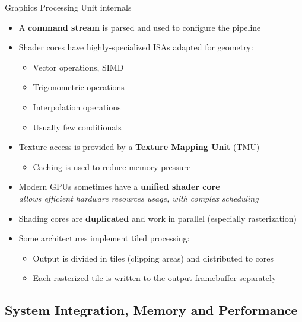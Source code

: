 \begin{frame}{Graphics Processing Unit internals}
  \begin{itemize}
  \item A \textbf{command stream} is parsed and used to configure the pipeline
  \item Shader cores have highly-specialized ISAs adapted for geometry:
  \begin{minipage}[b]{0.45\textwidth}
    \begin{itemize}
    \item Vector operations, SIMD
    \item Trigonometric operations
    \end{itemize}
  \end{minipage}
  \begin{minipage}[b]{0.45\textwidth}
    \begin{itemize}
    \item Interpolation operations
    \item Usually few conditionals
    \end{itemize}
  \end{minipage}
  \item Texture access is provided by a \textbf{Texture Mapping Unit} (TMU)
    \begin{itemize}
    \item Caching is used to reduce memory pressure
    \end{itemize}
  \item Modern GPUs sometimes have a \textbf{unified shader core}\\
    \textit{allows efficient hardware resources usage, with complex scheduling}
  \item Shading cores are \textbf{duplicated} and work in parallel (especially rasterization)
  \item Some architectures implement tiled processing:
    \begin{itemize}
    \item Output is divided in tiles (clipping areas) and distributed to cores
    \item Each rasterized tile is written to the output framebuffer separately
    \end{itemize}
  \end{itemize}
\end{frame}

\subsection{System Integration, Memory and Performance}

